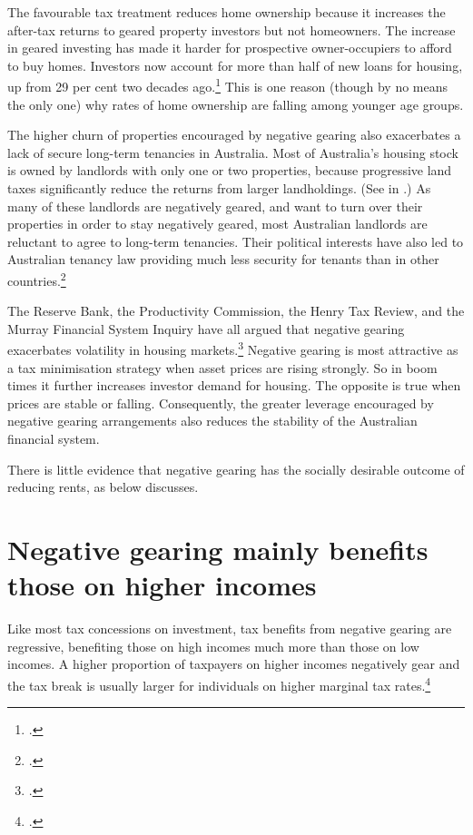 The favourable tax treatment reduces home ownership because it increases the after-tax returns to geared property investors but not homeowners. 
The increase in geared investing has made it harder for prospective owner-occupiers to afford to buy homes. 
Investors now account for more than half of new loans for housing, up from 29 per cent two decades ago.\footcite[][Table~8]{ABS2016a}  
This is one reason (though by no means the only one) why rates of home ownership are falling among younger age groups. 

The higher churn of properties encouraged by negative gearing also exacerbates a lack of secure long-term tenancies in Australia. 
Most of Australia’s housing stock is owned by landlords with only one or two properties, because progressive land taxes significantly reduce the returns from larger landholdings. (See  in .) 
As many of these landlords are negatively geared, and want to turn over their properties in order to stay negatively geared, most Australian landlords are reluctant to agree to long-term tenancies. 
Their political interests have also led to Australian tenancy law providing much less security for tenants than in other countries.\footcite[][19--21]{KellyMaresHarrisonEtAl2013} 

The Reserve Bank, the Productivity Commission, the Henry Tax Review, and the Murray Financial System Inquiry have all argued that negative gearing exacerbates volatility in housing markets.\footcites[][88]{RBA2014FinancialSystemInquirySubmission}[][45]{RBA2014SubmissionAffordableHousingInquiry}[][75 \& 131]{ProductivityCommission2004FirstHomeOwnership}[][70 \& 418]{HenryTaxReview2010}[][278]{FinancialSystemsInquiry2015}
Negative gearing is most attractive as a tax minimisation strategy when asset prices are rising strongly. 
So in boom times it further increases investor demand for housing. 
The opposite is true when prices are stable or falling. 
Consequently, the greater leverage encouraged by negative gearing arrangements also reduces the stability of the Australian financial system.

There is little evidence that negative gearing has the socially desirable outcome of reducing rents, as  below discusses.

\section{Negative gearing mainly benefits those on higher incomes}\label{NG-benefits-those-on-higher-incomes}
Like most tax concessions on investment, tax benefits from negative gearing are regressive, benefiting those on high incomes much more than those on low incomes. A higher proportion of taxpayers on higher incomes negatively gear and the tax break is usually larger for individuals on higher marginal tax rates.\footcites{FinancialSystemsInquiry2015}{Grudnoff2015}

